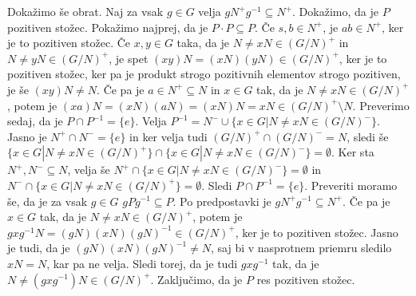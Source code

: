 \documentclass[a4paper, 12pt]{article}
\begin{document}
Dokažimo še obrat. Naj za vsak $g\in G$ velja $g N^+ g^{-1} \subseteq N^+$. Dokažimo, da je $P$ pozitiven stožec. Pokažimo najprej, da je $P\cdot P \subseteq P$. Če $s,b\in N^+$, je $ab \in N^+$, ker je to pozitiven stožec. Če $x,y\in G$ taka, da je $N\neq xN \in (G/N)^+$ in $N \neq yN \in (G/N)^+$, je spet $(xy)N = (xN) (yN)\in (G/N)^+$, ker je to pozitiven stožec, ker pa je produkt strogo pozitivnih elementov strogo pozitiven, je še $(xy)N \neq N$. Če pa je $a\in N^+\subseteq N$ in $x\in G$ tak, da je $N\neq xN \in (G/N)^+$, potem je $(xa)N = (xN) (aN) = (xN)N = xN\in (G/N)^+ \setminus N$. Preverimo sedaj, da je $P\cap P^{-1} = \{e\}$. Velja $P^{-1} = N^- \cup \{ x\in G| N \neq xN \in (G/N)^-\}$. Jasno je $N^+ \cap N^- = \{e\}$ in ker velja tudi $(G/N)^+ \cap (G/N)^- = N$, sledi še $\{x\in G| N \neq xN \in (G/N)^+\} \cap \{x\in G| N \neq xN \in (G/N)^-\} = \emptyset$. Ker sta $N^+, N^- \subseteq  N$, velja še $N^+ \cap \{x\in G|  N \neq xN \in (G/N)^-\} = \emptyset$ in $N^- \cap \{x\in G|  N \neq xN \in (G/N)^+\} = \emptyset$. Sledi $P\cap P^{-1} = \{e\}$. Preveriti moramo še, da je za vsak $g\in G$ $gPg^{-1} \subseteq P$. Po predpostavki je $gN^+ g^{-1} \subseteq N^+$. Če pa je $x\in G$ tak, da je $N\neq xN \in (G/N)^+$, potem je $gxg^{-1} N = (gN) (xN) (gN)^{-1} \in (G/N)^+$, ker je to pozitiven stožec. Jasno je tudi, da je $(gN)(xN)(gN)^{-1} \neq N$, saj bi v nasprotnem priemru sledilo $xN = N$, kar pa ne velja. Sledi torej, da je tudi $gxg^{-1}$ tak, da je $N\neq (gxg^{-1})N \in (G/N)^+$. Zaključimo, da je $P$ res pozitiven stožec.
\end{document}
